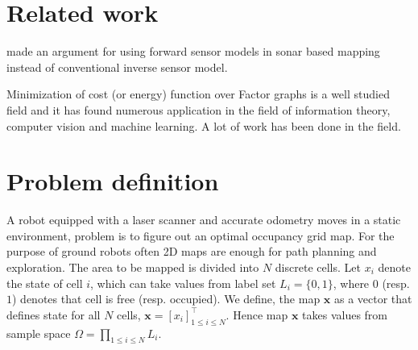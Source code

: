\documentclass[letterpaper, 10 pt, conference]{ieeeconf} %
\newcommand{\vect}[1]{\mathbf{#1}}
\begin{document}
\section{Related work}

\cite{thrun2003learning} made an argument for using forward sensor models in sonar based mapping instead of conventional inverse sensor model.


Minimization of cost (or energy) function over Factor graphs is a well studied field and it has found numerous application in the field of information theory, computer vision and machine learning. A lot of work has been done in the field.

\section{Problem definition}
\newcommand{\map}{\vect{x}}
A robot equipped with a laser scanner and accurate odometry moves in a static
environment, problem is to figure out an optimal occupancy grid map. For the
purpose of ground robots often 2D maps are enough for path planning and
exploration.
The area to be mapped is divided into $N$ discrete cells. Let $x_i$ denote the state of cell $i$, which can take values from label set $L_i = \{0, 1\}$, where $0$ (resp. $1$) denotes that cell is free (resp. occupied). We define, the map $\map$ as a vector that defines state for all $N$ cells, $\map = [x_i]^\top_{1 \le i \le N}$. Hence map $\map$ takes values from sample space $\Omega = \prod_{1 \le i \le N}L_i$.
\end{document}
